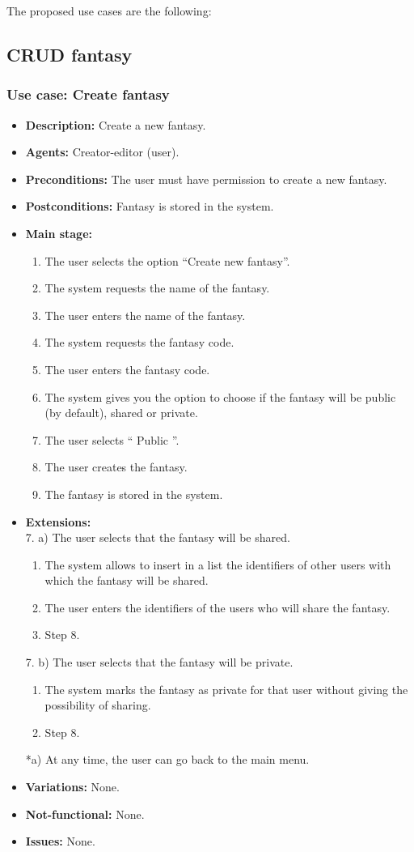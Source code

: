 The proposed use cases are the following:

\subsection{CRUD fantasy}
\hypertarget{crearfantasia}{}
\subsubsection{Use case: Create fantasy}
\begin{itemize}
	\item \textbf{Description:} Create a new fantasy.
	\item \textbf{Agents:} Creator-editor (user).
	\item \textbf{Preconditions:} The user must have permission to create a new fantasy.
	\item \textbf{Postconditions:} Fantasy is stored in the system.
	\item \textbf{Main stage:}
	\begin{enumerate}
		\item The user selects the option ``Create new fantasy''.
		\item The system requests the name of the fantasy.
		\item The user enters the name of the fantasy.
		\item The system requests the fantasy code.
		\item The user enters the fantasy code.
		\item The system gives you the option to choose if the fantasy will be public (by default), shared or private.
		\item The user selects `` Public ''.
		\item The user creates the fantasy.
		\item The fantasy is stored in the system.
	\end{enumerate}
	\item \textbf{Extensions:} \\7. a) The user selects that the fantasy will be shared.
	\begin{enumerate}
		\item The system allows to insert in a list the identifiers of other users with which the fantasy will be shared.
		\item The user enters the identifiers of the users who will share the fantasy.
		\item Step 8.
	\end{enumerate}
	7. b) The user selects that the fantasy will be private.
	\begin{enumerate}
		\item The system marks the fantasy as private for that user without giving the possibility of sharing.
		\item Step 8.
	\end{enumerate}
	*a) At any time, the user can go back to the main menu.
	\item \textbf{Variations:} None.
	\item \textbf{Not-functional:} None.
	\item \textbf{Issues:} None.
\end{itemize}

